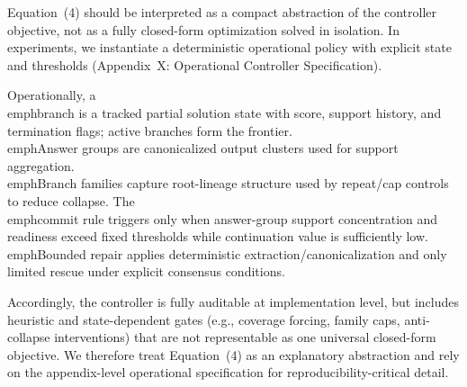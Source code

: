 Equation~(4) should be interpreted as a compact abstraction of the controller objective, not as a fully closed-form optimization solved in isolation. In experiments, we instantiate a deterministic operational policy with explicit state and thresholds (Appendix~X: Operational Controller Specification).

Operationally, a \\emph{branch} is a tracked partial solution state with score, support history, and termination flags; active branches form the frontier. \\emph{Answer groups} are canonicalized output clusters used for support aggregation. \\emph{Branch families} capture root-lineage structure used by repeat/cap controls to reduce collapse. The \\emph{commit rule} triggers only when answer-group support concentration and readiness exceed fixed thresholds while continuation value is sufficiently low. \\emph{Bounded repair} applies deterministic extraction/canonicalization and only limited rescue under explicit consensus conditions.

Accordingly, the controller is fully auditable at implementation level, but includes heuristic and state-dependent gates (e.g., coverage forcing, family caps, anti-collapse interventions) that are not representable as one universal closed-form objective. We therefore treat Equation~(4) as an explanatory abstraction and rely on the appendix-level operational specification for reproducibility-critical detail.
